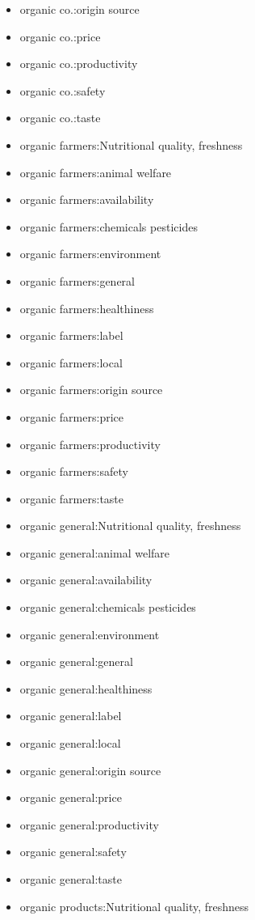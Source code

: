 \begin{multicols}{2}
\begin{itemize}[leftmargin=*]
		\item[] organic co.:origin source
		\item[] organic co.:price
		\item[] organic co.:productivity 
		\item[] organic co.:safety
		\item[] organic co.:taste
		\item[] organic farmers:Nutritional quality, freshness 
		\item[] organic farmers:animal welfare 
		\item[] organic farmers:availability
		\item[] organic farmers:chemicals pesticides
		\item[] organic farmers:environment
		\item[] organic farmers:general
		\item[] organic farmers:healthiness
		\item[] organic farmers:label 
		\item[] organic farmers:local 
		\item[] organic farmers:origin source 
		\item[] organic farmers:price 
		\item[] organic farmers:productivity
		\item[] organic farmers:safety 
		\item[] organic farmers:taste 
		\item[] organic general:Nutritional quality, freshness 
		\item[] organic general:animal welfare 
		\item[] organic general:availability
		\item[] organic general:chemicals pesticides
		\item[] organic general:environment
		\item[] organic general:general
		\item[] organic general:healthiness
		\item[] organic general:label 
		\item[] organic general:local 
		\item[] organic general:origin source 
		\item[] organic general:price 
		\item[] organic general:productivity
		\item[] organic general:safety 
		\item[] organic general:taste 
		\item[] organic products:Nutritional quality, freshness 

\end{itemize}
\end{multicols}
